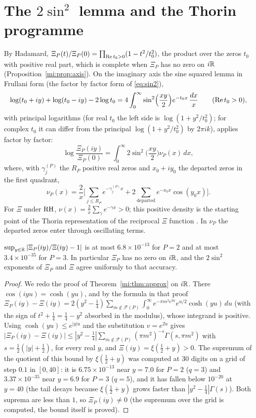 \section{The \texorpdfstring{$2\sin^2$}{2 sin^2} lemma and the Thorin programme}\label{mi:sec:sin2}

By Hadamard, $\Xi_P(t)/\Xi_P(0)=\prod_{\operatorname{Re} t_0>0}(1-t^2/t_0^2)$, the product over the zeros $t_0$ with positive real part, which is complete when $\Xi_P$ has no zero on $i\mathbb{R}$ (Proposition~\ref{mi:prop:axis}). On the imaginary axis the sine squared lemma in Frullani form (the factor by factor form of \eqref{eq:sin2}),
\[
\log(t_0+iy)+\log(t_0-iy)-2\log t_0=4\int_0^\infty\sin^2\!\Big(\frac{xy}2\Big)e^{-t_0x}\,\frac{dx}x\qquad(\operatorname{Re} t_0>0),
\]
with principal logarithms (for real $t_0$ the left side is $\log(1+y^2/t_0^2)$; for complex $t_0$ it can differ from the principal $\log(1+y^2/t_0^2)$ by $2\pi ik$), applies factor by factor:
\begin{equation}\label{mi:eq:levy}
\log\frac{\Xi_P(iy)}{\Xi_P(0)}=\int_0^\infty2\sin^2\!\Big(\frac{xy}2\Big)\nu_P(x)\,dx,
\end{equation}
where, with $\gamma_j^{(P)}$ the $R_P$ positive real zeros and $x_0+iy_0$ the departed zeros in the first quadrant,
\[
\nu_P(x)=\frac2x\Big[\sum_{j\le R_P}e^{-\gamma_j^{(P)}x}+2\sum_{\text{departed}}e^{-x_0x}\cos(y_0x)\Big].
\]
For $\Xi$ under $\mathrm{RH}$, $\nu(x)=\frac2x\sum_\gamma e^{-\gamma x}>0$; this positive density is the starting point of the Thorin representation of the reciprocal $\Xi$ function \cite{P17}. In $\nu_P$ the departed zeros enter through oscillating terms.

\begin{proposition}\label{mi:prop:axis}
$\sup_{y\in\mathbb{R}}|\Xi_P(iy)/\Xi(iy)-1|$ is at most $6.8\times10^{-13}$ for $P=2$ and at most $3.4\times10^{-35}$ for $P=3$. In particular $\Xi_P$ has no zero on $i\mathbb{R}$, and the $2\sin^2$ exponents of $\Xi_P$ and $\Xi$ agree uniformly to that accuracy.
\end{proposition}

\begin{proof}
We redo the proof of Theorem~\ref{mi:thm:approx} on $i\mathbb{R}$. There $\cos(iyu)=\cosh(yu)$, and by the formula in that proof $\Xi_P(iy)-\Xi(iy)=2(y^2-\frac14)\sum_{m\notin\mathcal F(P)}\int_0^\infty e^{-\pi m^2e^{2u}}e^{u/2}\cosh(yu)\,du$ (with the sign of $t^2+\frac14=\frac14-y^2$ absorbed in the modulus), whose integrand is positive. Using $\cosh(yu)\le e^{|y|u}$ and the substitution $v=e^{2u}$ gives $|\Xi_P(iy)-\Xi(iy)|\le|y^2-\frac14|\sum_{m\notin\mathcal F(P)}(\pi m^2)^{-s}\Gamma(s,\pi m^2)$ with $s=\frac12(|y|+\frac12)$, for every real $y$, and $\Xi(iy)=\xi(\frac12+y)>0$. The supremum of the quotient of this bound by $\xi(\frac12+y)$ was computed at $30$ digits on a grid of step $0.1$ in $[0,40]$: it is $6.75\times10^{-13}$ near $y=7.0$ for $P=2$ ($q=3$) and $3.37\times10^{-35}$ near $y=6.9$ for $P=3$ ($q=5$), and it has fallen below $10^{-20}$ at $y=40$ (the tail decays because $\xi(\frac12+y)$ grows faster than $|y^2-\frac14|\Gamma(s)$). Both suprema are less than $1$, so $\Xi_P(iy)\ne0$ (the supremum over the grid is computed, the bound itself is proved).
\end{proof}

